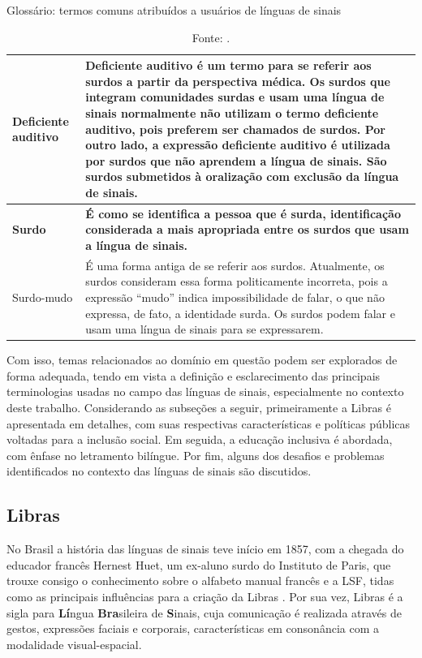 \begin{table}[htbp]
\caption{Glossário: termos comuns atribuídos a usuários de línguas de sinais}
\label{tab:glossario:termos-usuarios}
\begin{tabularx}{\textwidth}{l|X} \hline
Deficiente auditivo & Deficiente auditivo é um termo para se referir aos surdos a partir da perspectiva médica. Os surdos que integram comunidades surdas e usam uma língua de sinais normalmente não utilizam o termo deficiente auditivo, pois preferem ser chamados de surdos. Por outro lado, a expressão deficiente auditivo é utilizada por surdos que não aprendem a língua de sinais. São surdos submetidos à oralização com exclusão da língua de sinais. \\ \hline
\textbf{Surdo} & \textbf{É como se identifica a pessoa que é surda, identificação considerada a mais apropriada entre os surdos que usam a língua de sinais.} \\ \hline
Surdo-mudo & É uma forma antiga de se referir aos surdos. Atualmente, os surdos consideram essa forma politicamente incorreta, pois a expressão ``mudo'' indica impossibilidade de falar, o que não expressa, de fato, a identidade surda. Os surdos podem falar e usam uma língua de sinais para se expressarem. \\ \hline
\end{tabularx}
\caption*{Fonte: .}
\end{table}

Com isso, temas relacionados ao domínio em questão podem ser explorados de forma adequada, tendo em vista a definição e esclarecimento das principais terminologias usadas no campo das línguas de sinais, especialmente no contexto deste trabalho. Considerando as subseções a seguir, primeiramente a Libras é apresentada em detalhes, com suas respectivas características e políticas públicas voltadas para a inclusão social. Em seguida, a educação inclusiva é abordada, com ênfase no letramento bilíngue. Por fim, alguns dos desafios e problemas identificados no contexto das línguas de sinais são discutidos.

\subsection{Libras}
\label{fundamentacao-teorica:linguas-sinais:libras}

No Brasil a história das línguas de sinais teve início em 1857, com a chegada do educador francês Hernest Huet, um ex-aluno surdo do Instituto de Paris, que trouxe consigo o conhecimento sobre o alfabeto manual francês e a LSF, tidas como as principais influências para a criação da Libras \cite{Honora2017,Almeida2015}. Por sua vez, Libras é a sigla para \textbf{Lí}ngua \textbf{Bra}sileira de \textbf{S}inais, cuja comunicação é realizada através de gestos, expressões faciais e corporais, características em consonância com a modalidade visual-espacial.


